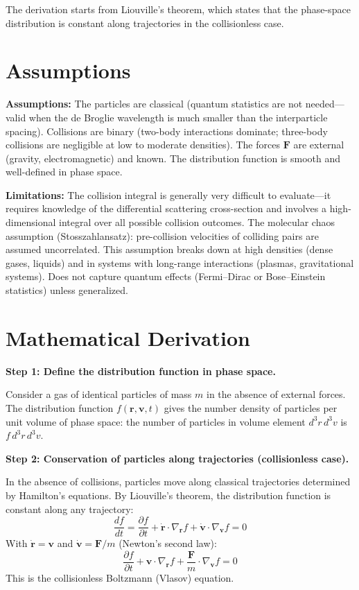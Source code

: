 The derivation starts from Liouville's theorem, which states that the phase-space distribution is constant along trajectories in the collisionless case.

\section*{Assumptions}

\textbf{Assumptions:} The particles are classical (quantum statistics are not needed---valid when the de Broglie wavelength is much smaller than the interparticle spacing). Collisions are binary (two-body interactions dominate; three-body collisions are negligible at low to moderate densities). The forces $\mathbf{F}$ are external (gravity, electromagnetic) and known. The distribution function is smooth and well-defined in phase space.


\textbf{Limitations:} The collision integral is generally very difficult to evaluate---it requires knowledge of the differential scattering cross-section and involves a high-dimensional integral over all possible collision outcomes. The molecular chaos assumption (Stosszahlansatz): pre-collision velocities of colliding pairs are assumed uncorrelated. This assumption breaks down at high densities (dense gases, liquids) and in systems with long-range interactions (plasmas, gravitational systems). Does not capture quantum effects (Fermi--Dirac or Bose--Einstein statistics) unless generalized.


\section*{Mathematical Derivation}

\textbf{Step 1: Define the distribution function in phase space.}

Consider a gas of identical particles of mass $m$ in the absence of external forces. The distribution function $f(\mathbf{r},\mathbf{v},t)$ gives the number density of particles per unit volume of phase space: the number of particles in volume element $d^3r\,d^3v$ is $f\,d^3r\,d^3v$.

\textbf{Step 2: Conservation of particles along trajectories (collisionless case).}

In the absence of collisions, particles move along classical trajectories determined by Hamilton's equations. By Liouville's theorem, the distribution function is constant along any trajectory:
\begin{equation}
\frac{df}{dt} = \frac{\partial f}{\partial t} + \dot{\mathbf{r}}\cdot\nabla_{\mathbf{r}} f + \dot{\mathbf{v}}\cdot\nabla_{\mathbf{v}} f = 0
\end{equation}
With $\dot{\mathbf{r}} = \mathbf{v}$ and $\dot{\mathbf{v}} = \mathbf{F}/m$ (Newton's second law):
\begin{equation}
\frac{\partial f}{\partial t} + \mathbf{v}\cdot\nabla_{\mathbf{r}} f + \frac{\mathbf{F}}{m}\cdot\nabla_{\mathbf{v}} f = 0
\end{equation}
This is the collisionless Boltzmann (Vlasov) equation.

